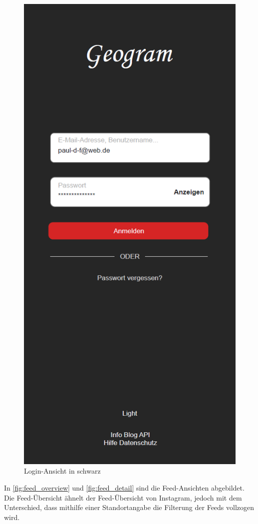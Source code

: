 \begin{figure}[H]
\begin{minipage}{.5\textwidth}
      \includegraphics[width=.6\linewidth]{images/Login_MockUp_Black.png}
      \caption{Login-Ansicht in schwarz}
      \label{fig:login_black}
    \end{minipage}
\end{figure}

In \autoref{fig:feed_overview} und \autoref{fig:feed_detail} sind die Feed-Ansichten abgebildet. Die Feed-Übersicht ähnelt der Feed-Übersicht von Instagram, jedoch mit dem Unterschied, dass mithilfe einer Standortangabe die Filterung der Feeds vollzogen wird.

